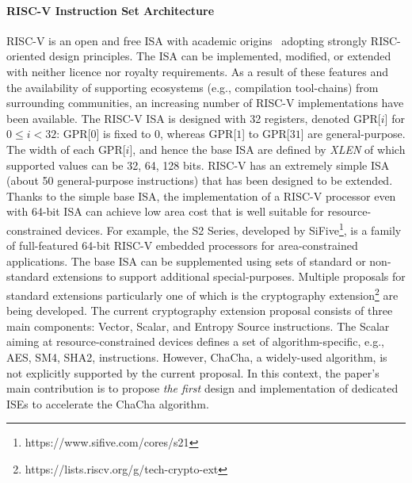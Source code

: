 \paragraph{RISC-V Instruction Set Architecture}
RISC-V is an open and free ISA with academic origins~\cite{riscv:14} adopting strongly RISC-oriented design principles. 
The ISA can be implemented, modified, or extended with neither licence nor royalty requirements.
As a result of these features and the availability of supporting ecosystems (e.g., compilation tool-chains) from surrounding communities,
an increasing number of RISC-V implementations have been available.
The RISC-V ISA is designed with 32 registers, denoted GPR[$i$] for $0 \le i < 32$: GPR[$0$] is fixed to 0, whereas GPR[$1$] to GPR[$31$] are general-purpose. 
The width of each GPR[$i$], and hence the base ISA are defined by \emph{XLEN} of which supported values can be 32, 64, 128 bits. 
RISC-V has an extremely simple ISA (about 50 general-purpose instructions) that has been designed to be extended.
Thanks to the simple base ISA, the implementation of a RISC-V processor even with 64-bit ISA can achieve low area cost 
that is well suitable for resource-constrained devices. 
For example, the S2 Series, developed by SiFive\footnote{https://www.sifive.com/cores/s21}, is a family of full-featured 64-bit RISC-V embedded processors for area-constrained applications.
The base ISA can be supplemented using sets of standard or non-standard extensions to support additional special-purposes.
Multiple proposals for standard extensions particularly one of which is the cryptography extension\footnote{https://lists.riscv.org/g/tech-crypto-ext} are being developed. The current cryptography extension proposal consists of three main components: Vector, Scalar, and Entropy Source instructions.
The Scalar aiming at resource-constrained devices defines a set of algorithm-specific, e.g., AES, SM4, SHA2, instructions. 
However, ChaCha, a widely-used algorithm, is not explicitly supported by the current proposal. 
In this context, the paper's main contribution is to propose \emph{the first} design and implementation of dedicated ISEs to accelerate the ChaCha algorithm.

